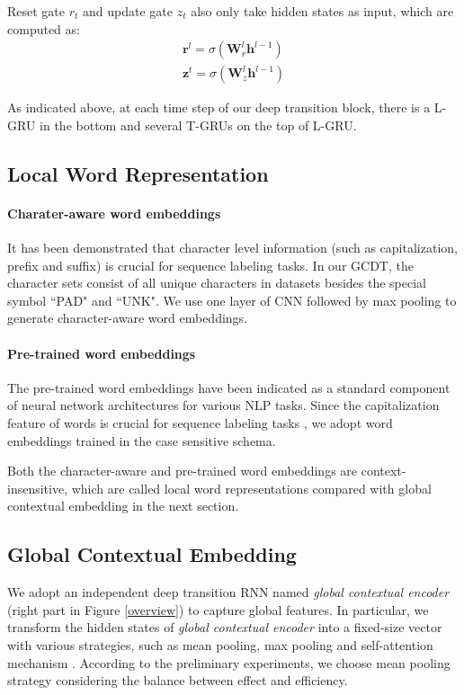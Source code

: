 \documentclass[11pt,a4paper]{article}
\begin{document}
Reset gate $r_t$ and update gate $z_t$ also only take hidden states as input, which are computed as:
\begin{align}
\mathbf{r}^l = \sigma(\mathbf{W}^{l}_{r} \mathbf{h}^{l-1}) \\
\mathbf{z}^t = \sigma(\mathbf{W}^{l}_{z} \mathbf{h}^{l-1})
\end{align}

As indicated above, at each time step of our deep transition block, there is a L-GRU in the bottom and several T-GRUs on the top of L-GRU.

\subsection{Local Word Representation}
\paragraph{Charater-aware word embeddings} 
It has been demonstrated that character level information (such as capitalization, prefix and suffix) \cite{collobert2011,first_CNN} is crucial for sequence labeling tasks. In our GCDT, the character sets consist of all unique characters in datasets besides the special symbol ``PAD" and ``UNK". We use one layer of CNN followed by max pooling to generate character-aware word embeddings.

\paragraph{Pre-trained word embeddings} 
The pre-trained word embeddings have been indicated as a standard component of neural network architectures for various NLP tasks. Since the capitalization feature of words is crucial for sequence labeling tasks \cite{collobert2011}, we adopt word embeddings trained in the case sensitive schema. 

Both the character-aware and pre-trained word embeddings are context-insensitive, which are called local word representations compared with global contextual embedding in the next section.

\subsection{Global Contextual Embedding}
We adopt an independent deep transition RNN named \emph{global contextual encoder} (right part in Figure \ref{overview}) to capture global features. In particular, we transform the hidden states of \emph{global contextual encoder} into a fixed-size vector with various strategies, such as mean pooling, max pooling and self-attention mechanism \cite{attention}. According to the preliminary experiments, we choose mean pooling strategy considering the balance between effect and efficiency.
\end{document}
